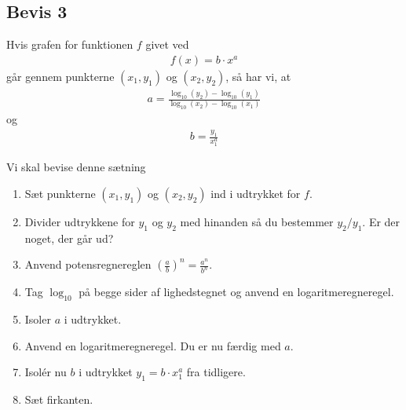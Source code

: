 \subsection*{Bevis 3}
\begin{setn}
	Hvis grafen for funktionen $f$ givet ved
	\begin{align*}
		f(x) = b\cdot x^a
	\end{align*}	 
	går gennem punkterne $(x_1,y_1)$ og $(x_2,y_2)$, så har vi, at 
	\begin{align*}
		a = \frac{\log_{10}(y_2)-\log_{10}(y_1)}{\log_{10}(x_2)-\log_{10}(x_1)}
	\end{align*}
	og
	\begin{align*}
		b = \frac{y_1}{x_1^{a}}
	\end{align*}
\end{setn}
Vi skal bevise denne sætning
\begin{enumerate}[label=\roman*)]
	\item Sæt punkterne $(x_1,y_1)$ og $(x_2,y_2)$ ind i udtrykket for $f$. 
	\item Divider udtrykkene for $y_1$ og $y_2$ med hinanden så du bestemmer $y_2/y_1$. Er der noget, der går ud?
	\item Anvend potensregnereglen $\left(\frac{a}{b}\right)^n = \frac{a^n}{b^n}$.
	\item Tag $\log_{10}$ på begge sider af lighedstegnet og anvend en logaritmeregneregel.
	\item Isoler $a$ i udtrykket.
	\item Anvend en logaritmeregneregel. Du er nu færdig med $a$.
	\item Isolér nu $b$ i udtrykket $y_1 = b\cdot x_1^a$ fra tidligere.
	\item Sæt firkanten.
\end{enumerate}

\newpage


